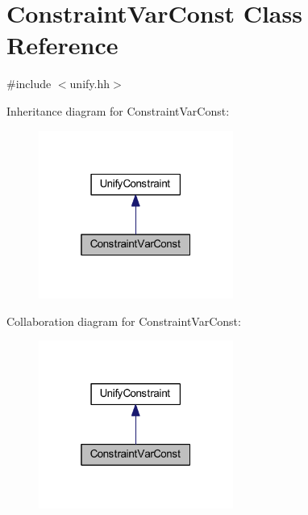 \hypertarget{class_constraint_var_const}{}\section{Constraint\+Var\+Const Class Reference}
\label{class_constraint_var_const}


{\ttfamily \#include $<$unify.\+hh$>$}



Inheritance diagram for Constraint\+Var\+Const\+:
\nopagebreak
\begin{figure}[H]
\begin{center}
\leavevmode
\includegraphics[width=181pt]{class_constraint_var_const__inherit__graph}
\end{center}
\end{figure}


Collaboration diagram for Constraint\+Var\+Const\+:
\nopagebreak
\begin{figure}[H]
\begin{center}
\leavevmode
\includegraphics[width=181pt]{class_constraint_var_const__coll__graph}
\end{center}
\end{figure}
